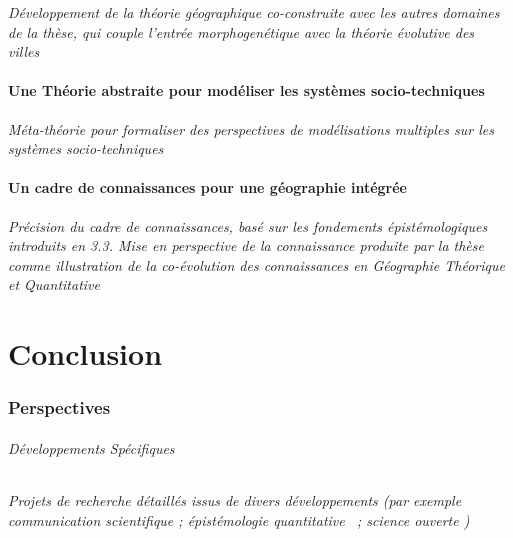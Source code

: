 \textit{Développement de la théorie géographique co-construite avec les autres domaines de la thèse, qui couple l'entrée morphogenétique avec la théorie évolutive des villes~\cite{raimbault:halshs-01422484}}


\subsection{Une Théorie abstraite pour modéliser les systèmes socio-techniques}

\textit{Méta-théorie pour formaliser des perspectives de modélisations multiples sur les systèmes socio-techniques} 



\subsection{Un cadre de connaissances pour une géographie intégrée}

\textit{Précision du cadre de connaissances, basé sur les fondements épistémologiques introduits en 3.3. Mise en perspective de la connaissance produite par la thèse comme illustration de la co-évolution des connaissances en Géographie Théorique et Quantitative~\cite{raimbault2017theo}}



\part*{Conclusion}


\section*{Perspectives}

\paragraph{Développements Spécifiques}

\textit{Projets de recherche détaillés issus de divers développements (par exemple communication scientifique 
\cite{serra2016game} ; épistémologie quantitative~\cite{raimbault2016techno} ; science ouverte
\cite{cybergeo20})}

